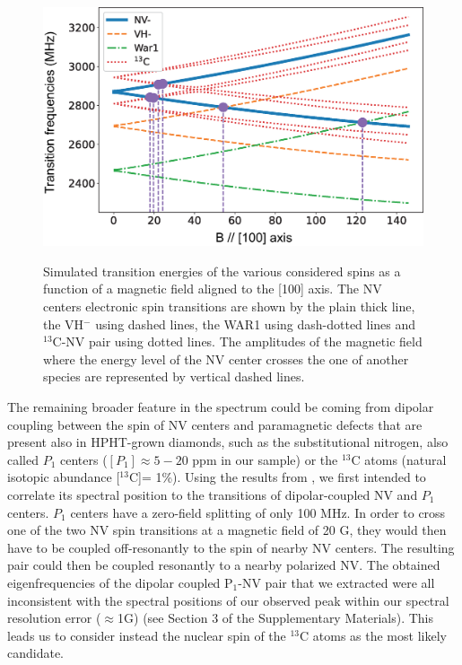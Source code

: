 \documentclass[9pt,twocolumn,twoside]{revtex4-1}
\begin{document}
\begin{figure}[htbp]
\centering
{\includegraphics[width=\linewidth]{Theorie_CR}}
\caption{Simulated transition energies of the various considered spins as a function of a magnetic field aligned to the [100] axis. The NV centers electronic spin transitions are shown by the plain thick line, the VH$^-$ using dashed lines, the WAR1 using dash-dotted lines and $^{13}$C-NV pair using dotted lines. The amplitudes of the magnetic field where the energy level of the NV center crosses the one of another species are represented by vertical dashed lines.}
\label{energy-levels}
\end{figure}
The remaining broader feature in the spectrum could be coming from dipolar coupling between the spin of NV centers and paramagnetic defects that are present also in HPHT-grown diamonds, such as the substitutional nitrogen, also called $P_1$ centers ($[P_1]\approx 5-20$ ppm in our sample) or the $^{13}$C atoms (natural isotopic abundance [$^{13}$C]= 1\%). 
Using the results from \cite{simanovskaia_sidebands_2013}, we first intended to correlate its spectral position to the transitions of dipolar-coupled NV and $P_1$ centers. 
 $P_1$ centers have a zero-field splitting of only 100 MHz. In order to cross one of the two NV spin transitions at a magnetic field of 20 G, they would then have to be coupled off-resonantly to the spin of nearby NV centers. The resulting pair could then be coupled resonantly to a nearby polarized NV.
The obtained eigenfrequencies of the dipolar coupled P$_1$-NV pair that we extracted were all inconsistent with the spectral positions of our observed peak within our spectral resolution error ($\approx$1G) (see Section 3 of the Supplementary Materials). This leads us to consider instead the nuclear spin of the $^{13}$C atoms as the most likely candidate.
\end{document}
